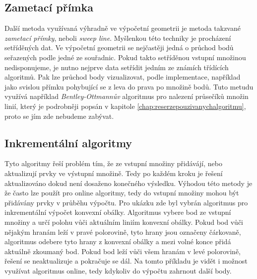 \subsection{Zametací přímka}
	Další metoda využívaná výhradně ve výpočetní geometrii je metoda takzvané \textit{zametací přímky}, neboli \textit{sweep line}. Myšlenkou této techniky je procházení setříděných dat. Ve výpočetní geometrii se nejčastěji jedná o průchod bodů seřazených podle jedné ze souřadnic. Pokud takto setříděnou vstupní množinou nedisponujeme, je nutno nejprve data setřídit jedním ze známích třídících algoritmů. Pak lze průchod body vizualizovat, podle implementace, například jako svislou přímku pohybující se z leva do prava po množině bodů.
	Tuto metudu využívá například \textit{Bentley-Ottmannův} algoritmus pro nalezení průsečíků množin linií, který je podrobněji popsán v kapitole \ref{chap:reserzepouzivanychalgoritmu}, proto se jím zde nebudeme zabývat.

\subsection{Inkrementální algoritmy}
	Tyto algoritmy řeší problém tím, že ze vstupní množiny přidávájí, nebo aktualizují prvky ve výstupní množině. Tedy po každém kroku je řešení aktualizováno dokud není dosaženo konečného výsledku. Výhodou této metody je že často lze použít pro online algoritmy, tedy do vstupní množiny mohou být přidávány prvky v průběhu výpočtu.
	Pro ukázku zde byl vybrán algoritmus pro inkrementální výpočet konvexní obálky. Algoritmus vybere bod ze vstupní množiny a určí polohu vůči aktuálním liniím konvexní obálky. Pokud bod vůči nějakým hranám leží v pravé polorovině, tyto hrany jsou označeny čárkovaně, algoritmus odebere tyto hrany z konvexní obálky a mezi volné konce přidá aktuálně zkoumaný bod. Pokud bod leží vůči všem hranám v levé polorovině, řešení se neaktualizuje a pokračuje se dál. Na tomto příkladu je vidět i možnost využívat algoritmus online, tedy kdykoliv do výpočtu zahrnout další body.

